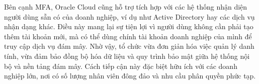 \begin{myitem}
\begin{mysubitem}
        \item Bên cạnh MFA, Oracle Cloud cũng hỗ trợ tích hợp với các hệ thống nhận diện người dùng sẵn có của doanh nghiệp, ví dụ như Active Directory hay các dịch vụ nhận dạng khác. Điều này mang lại sự tiện lợi vì người dùng không cần phải tạo thêm tài khoản mới, mà có thể dùng chính tài khoản doanh nghiệp của mình để truy cập dịch vụ đám mây. Nhờ vậy, tổ chức vừa đơn giản hóa việc quản lý danh tính, vừa đảm bảo đồng bộ hóa dữ liệu và quy trình bảo mật giữa hệ thống nội bộ và nền tảng đám mây. Cách tiếp cận này đặc biệt hữu ích với các doanh nghiệp lớn, nơi có số lượng nhân viên đông đảo và nhu cầu phân quyền phức tạp.
    \end{mysubitem}
    
\end{myitem}

